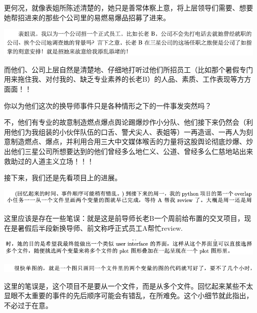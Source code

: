 \documentclass[9pt, b5paper]{article}
\begin{document}
更何况，就像表姐所陈述清楚的，她只是善常体察上意，将上层领导们需要、想要她帮招进来的那些个公司里的易燃易爆品招募了进来。

\begin{center}
\includegraphics[width=.9\linewidth]{./pic/backups_plans_20210511_102727.png}
\end{center}

而他们、公司上层自然是清楚地、仔细地打听过他们所招员工（比如那个暑假专门用来拖住我、对付我的、缺乏专业素养的长老B）的人品、素质、工作表现等方方面面！！

你以为他们这次的换导师事件只是各种情形之下的一件事发突然吗？

不，他们有专业的故意制造燃点爆点舆论踢爆炒作小分队、他们接下来仍然会（利用他们为我组装的小伙伴队伍的口舌、警犬尖人、表姐等）一再造谣、一再人为刻意制造燃点、爆点，并利用合用三大中文媒体喉舌的力量将这股舆论彻底炒爆、炒出他们三星公司所想要达到的他们曾经多么地仁义、公道、曾经多么仁慈地站出来救助过的人道主义立场！！！

接下来，我们还是先看项目上的进展。 

\begin{center}
\includegraphics[width=.9\linewidth]{./pic/backups_plans_20210511_105354.png}
\end{center}

这里应该是存在一些笔误：就是这是前导师长老B一个周前给布置的交叉项目，现在是暑假后半段新换导师、前文称呼正式员工A帮忙review. 

\begin{center}
\includegraphics[width=.9\linewidth]{./pic/backups_plans_20210511_105634.png}
\end{center}

\begin{center}
\includegraphics[width=.9\linewidth]{./pic/backups_plans_20210511_105715.png}
\end{center}

这里的笔误是，这个项目不是要从一个文件，而是从多个文件。回忆起来某些不太显眼不太重要的事件的先后顺序可能会有错乱，在所难免。这个小细节就此指出，不必过于在意。 
\end{document}
